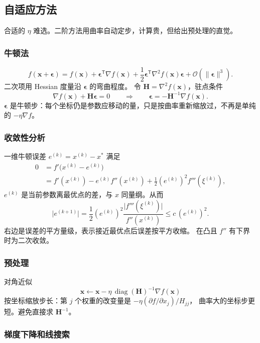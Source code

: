 \subsection{自适应方法}

合适的 $\eta$ 难选。二阶方法用曲率自动定步，计算贵，但给出预处理的直觉。

\subsubsection{牛顿法}

\[
f(\bm{x}+\bm{\epsilon})
=
f(\bm{x})+\bm{\epsilon}^{\mathsf T}\nabla f(\bm{x})
+\frac12\bm{\epsilon}^{\mathsf T}\nabla^2 f(\bm{x})\bm{\epsilon}
+\mathcal{O}(\|\bm{\epsilon}\|^3).
\]
二次项用 Hessian 度量沿 $\bm{\epsilon}$ 的弯曲程度。
令 $\bm{H}=\nabla^2 f(\bm{x})$，驻点条件
\[
\nabla f(\bm{x})+\bm{H}\bm{\epsilon}=0
\qquad\Rightarrow\qquad
\bm{\epsilon}=-\bm{H}^{-1}\nabla f(\bm{x}).
\]
$\bm{\epsilon}$ 是牛顿步：每个坐标仍是参数应移动的量，只是按曲率重新缩放过，不再是单纯的 $-\eta\nabla f$。

\subsubsection{收敛性分析}

一维牛顿误差 $e^{(k)}=x^{(k)}-x^{\ast}$ 满足
\begin{align*}
0&=f'\bigl(x^{(k)}-e^{(k)}\bigr)
\\
&=f'(x^{(k)})-e^{(k)}f''(x^{(k)})
+\frac12(e^{(k)})^2 f'''(\xi^{(k)}),
\end{align*}
$e^{(k)}$ 是当前参数离最优点的差，与 $x$ 同量纲。从而
\[
\bigl\lvert e^{(k+1)}\bigr\rvert
=
\frac12(e^{(k)})^2
\frac{\lvert f'''(\xi^{(k)})\rvert}{f''(x^{(k)})}
\leq
c\,(e^{(k)})^2.
\]
右边是误差的平方量级，表示接近最优点后误差按平方收缩。
在凸且 $f''$ 有下界时为二次收敛。

\subsubsection{预处理}

对角近似
\[
\bm{x}
\leftarrow
\bm{x}-\eta\,\operatorname{diag}(\bm{H})^{-1}\nabla f(\bm{x})
\]
按坐标缩放步长：第 $j$ 个权重的改变量是 $-\eta(\partial f/\partial x_j)/H_{jj}$，
曲率大的坐标步更短。避免直接求 $\bm{H}^{-1}$。

\subsubsection{梯度下降和线搜索}

